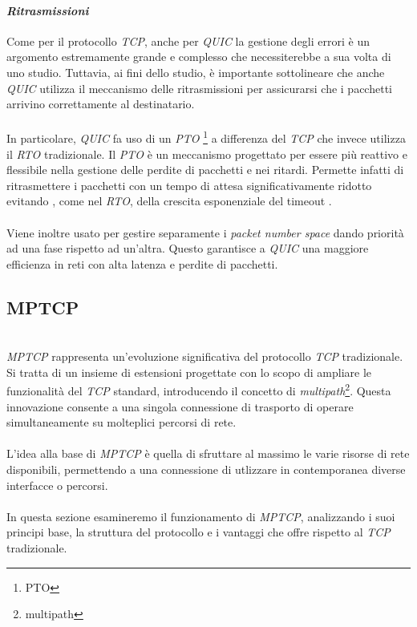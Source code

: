 \paragraph{\textit{Ritrasmissioni}}
\noindent Come per il protocollo \emph{TCP}, anche per \emph{QUIC} la gestione degli errori è un argomento estremamente grande e complesso che necessiterebbe a sua volta di uno studio. Tuttavia, ai fini dello studio, è importante sottolineare che anche \emph{QUIC} utilizza il meccanismo delle ritrasmissioni per assicurarsi che i pacchetti arrivino correttamente al destinatario. 
\\\\
In particolare, \emph{QUIC} fa uso di un \emph{PTO} \footnote{\gls{PTO}} a differenza del \emph{TCP} che invece utilizza il \emph{RTO} tradizionale.
Il \emph{PTO} è un meccanismo progettato per essere più reattivo e flessibile nella gestione delle perdite di pacchetti e nei ritardi.
Permette infatti di ritrasmettere i pacchetti con un tempo di attesa significativamente ridotto evitando , come nel \emph{RTO}, della crescita esponenziale del timeout \cite{site:pto-quic}.
\\\\
Viene inoltre usato per gestire separamente i \emph{packet number space} dando priorità ad una fase rispetto ad un'altra. 
Questo garantisce a \emph{QUIC} una maggiore efficienza in reti con alta latenza e perdite di pacchetti.
\subsection{MPTCP}
~\\
\indent \emph{MPTCP } rappresenta un'evoluzione significativa del protocollo \emph{TCP} tradizionale. 
Si tratta di un insieme di estensioni progettate con lo scopo di ampliare le funzionalità del \emph{TCP} standard,
introducendo il concetto di \emph{multipath}\footnote{\gls{multipath}}. Questa innovazione consente a una singola connessione di trasporto di operare simultaneamente su molteplici percorsi di rete.
\\\\
L'idea alla base di \emph{MPTCP} è quella di sfruttare al massimo le varie risorse di rete disponibili, permettendo a una connessione di utlizzare in contemporanea diverse interfacce o percorsi.
\\\\
In questa sezione esamineremo il funzionamento di \emph{MPTCP}, analizzando i suoi principi base, la struttura del protocollo e i vantaggi che offre rispetto al \emph{TCP} tradizionale. 

